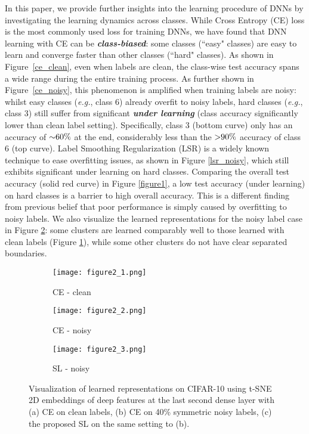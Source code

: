 \documentclass[10pt,twocolumn,letterpaper]{article}
\begin{document}
In this paper, we provide further insights into the learning procedure of DNNs by investigating the learning dynamics across classes. While Cross Entropy (CE) loss is the most commonly used loss for training DNNs, we have found that DNN learning with CE can be \textbf{\emph{class-biased}}: some classes (``easy" classes) are easy to learn and converge faster than other classes (``hard" classes). As shown in Figure~\ref{ce_clean}, even when labels are clean, the class-wise test accuracy spans a wide range during the entire training process. 
As further shown in Figure~\ref{ce_noisy}, this phenomenon is amplified when training labels are noisy: whilst easy classes (\textit{e.g.}, class 6) already overfit to noisy labels, hard classes (\textit{e.g.}, class 3) still suffer from significant \textbf{\emph{under learning}} (class accuracy significantly lower than clean label setting). Specifically, class 3 (bottom curve) only has an accuracy of ${\small\sim}60\%$ at the end, considerably less than the ${\small>}90\%$ accuracy of class 6 (top curve). Label Smoothing Regularization (LSR) \cite{szegedy2016rethinking,pereyra2017regularizing} is a widely known technique to ease overfitting issues, as shown in Figure \ref{lsr_noisy}, which still exhibits significant under learning on hard classes. Comparing the overall test accuracy (solid red curve) in Figure \ref{figure1}, a low test accuracy (under learning) on hard classes is a barrier to high overall accuracy. This is a different finding from previous belief that poor performance is simply caused by overfitting to noisy labels. We also visualize the learned representations for the noisy label case in Figure \ref{rep_ce_noisy}: some clusters are learned comparably well to those learned with clean labels (Figure \ref{rep_ce_clean}), while some other clusters do not have clear separated boundaries.

\begin{figure}[!t]
	\centering
	\begin{subfigure}{0.32\linewidth}
		\texttt{[image: figure2\_1.png]}
		\caption{CE - clean}
		\label{rep_ce_clean}
	\end{subfigure}
	\begin{subfigure}{0.32\linewidth} 
		\texttt{[image: figure2\_2.png]}
		\caption{CE - noisy} 
		\label{rep_ce_noisy}
	\end{subfigure}
	\begin{subfigure}{0.32\linewidth}
		\texttt{[image: figure2\_3.png]}
		\caption{SL - noisy}
		\label{rep_sce_noisy}
	\end{subfigure}
	\vspace{-0.1 in}
	\caption{Visualization of learned representations on CIFAR-10 using t-SNE 2D embeddings of deep features at the last second dense layer with (a) CE on clean labels, (b) CE on 40\% symmetric noisy labels, (c) the proposed SL on the same setting to (b).}
	\label{ce_sce_rep_40}
	\vspace{-0.15 in}
\end{figure}
\end{document}
